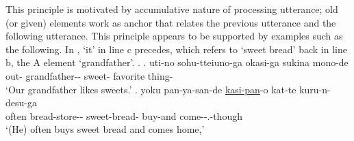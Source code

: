This principle is motivated by accumulative nature of processing utterance;
old (or given) elements work as anchor that relates
the previous utterance and the following utterance.
This principle appears to be supported by examples such as the following.
%
In \Next,
 `it' in line c precedes,
which refers to  `sweet bread' back in line b,
the A element  `grandfather'.
%
\ex. \label{PronIni1}
 \ag. uti-no sohu-tteiuno-ga okasi-ga sukina mono-de \\
 		out- grandfather-- sweet- favorite thing- \\
		`Our grandfather likes sweets.'
 \bg. yoku pan-ya-san-de \ul{\ul{kasi-pan}}-o kat-te kuru-n-desu-ga \\
   often bread-store-- sweet-bread- buy-and come--.-though \\
   `(He) often buys sweet bread and comes home,'
